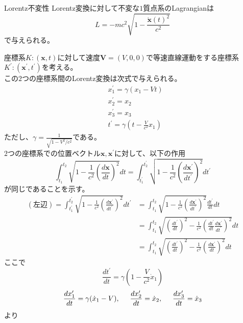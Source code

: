 \documentclass{jsarticle}
\begin{document}
\begin{itembox}[l]{Lorentz不変性}
Lorentz変換に対して不変な\(1\)質点系のLagrangianは
\[L=-mc^{2}\sqrt{1-\frac{\dot{\bm{x}}(t)^{2}}{c^{2}}}\]
で与えられる。
\end{itembox}
座標系\(K:(\bm{x},t)\)に対して速度\(\bm{V}=(V,0,0)\)で等速直線運動をする座標系\(K^{\prime}:(\bm{x}^{\prime},t^{\prime})\)を考える。\\
この\(2\)つの座標系間のLorentz変換は次式で与えられる。
\begin{align*}
&x_{1}^{\prime}=\gamma(x_{1}-Vt)\\
&x_{2}^{\prime}=x_{2}\\
&x_{3}^{\prime}=x_{3}\\
&t^{\prime}=\gamma\left(t-\frac{V}{c^{2}}x_{1}\right)
\end{align*}
ただし、\(\displaystyle \gamma=\frac{1}{\sqrt{1-V^{2}/c^{2}}}\)である。\\
\(2\)つの座標系での位置ベクトル\(\bm{x},\bm{x}^{\prime}\)に対して、以下の作用
\[\int_{t_{1}}^{t_{2}}\sqrt{1-\frac{1}{c^{2}}\left(\frac{d\bm{x}}{dt}\right)^{2}}dt=\int_{t_{1}^{\prime}}^{t_{2}^{\prime}}\sqrt{1-\frac{1}{c^{2}}\left(\frac{d\bm{x}^{\prime}}{dt^{\prime}}\right)^{2}}dt^{\prime}\]
が同じであることを示す。
\begin{align*}
(左辺)=\int_{t_{1}^{\prime}}^{t_{2}^{\prime}}\sqrt{1-\frac{1}{c^{2}}\left(\frac{d\bm{x}^{\prime}}{dt^{\prime}}\right)^{2}}dt^{\prime}&=\int_{t_{1}}^{t_{2}}\sqrt{1-\frac{1}{c^{2}}\left(\frac{d\bm{x}^{\prime}}{dt^{\prime}}\right)^{2}}\frac{dt^{\prime}}{dt}dt\\
&=\int_{t_{1}}^{t_{2}}\sqrt{\left(\frac{dt^{\prime}}{dt}\right)^{2}-\frac{1}{c^{2}}\left(\frac{dt^{\prime}}{dt}\frac{d\bm{x}^{\prime}}{dt^{\prime}}\right)^{2}}dt\\
&=\int_{t_{1}}^{t_{2}}\sqrt{\left(\frac{dt^{\prime}}{dt}\right)^{2}-\frac{1}{c^{2}}\left(\frac{d\bm{x}^{\prime}}{dt}\right)^{2}}dt
\end{align*}
ここで
\[\frac{dt^{\prime}}{dt}=\gamma\left(1-\frac{V}{c^{2}}\dot{x}_{1}\right)\]
\[\frac{dx_{1}^{\prime}}{dt}=\gamma(\dot{x}_{1}-V),\hspace{5mm}\frac{dx_{2}^{\prime}}{dt}=\dot{x}_{2},\hspace{5mm}\frac{dx_{3}^{\prime}}{dt}=\dot{x}_{3}\]
より
\end{document}
